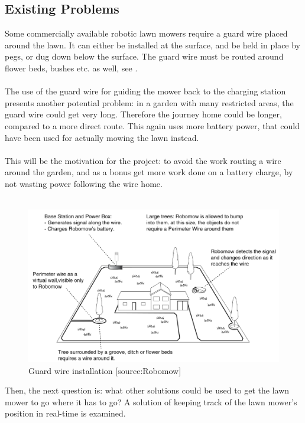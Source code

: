 \subsection{Existing Problems}
Some commercially available robotic lawn mowers require a guard wire placed around the lawn. It can either be installed at the surface, and be held in place by pegs, or dug down below the surface. The guard wire must be routed around flower beds, bushes etc. as well, see .\\\\
%
The use of the guard wire for guiding the mower back to the charging station presents another potential problem: in a garden with many restricted areas, the guard wire could get very long. Therefore the journey home could be longer, compared to a more direct route. This again uses more battery power, that could have been used for actually mowing the lawn instead.\\\\
%
This will be the motivation for the project: to avoid the work routing a wire around the garden, and as a bonus get more work done on a battery charge, by not wasting power following the wire home.\\\\

\begin{figure}[H]
\centering
\includegraphics[scale=0.6]{figures/robomow.png} 
\caption{Guard wire installation [source:Robomow]}
\label{fig:robomow} 
\end{figure}
\noindent

Then, the next question is: what other solutions could be used to get the lawn mower to go where it has to go?
A solution of keeping track of the lawn mower's position in real-time is examined.
